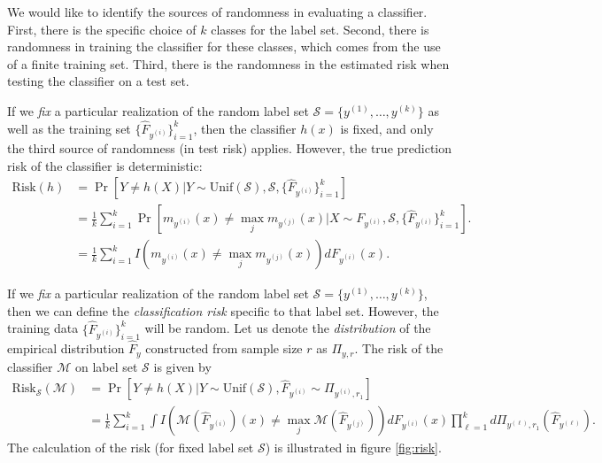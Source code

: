 We would like to identify the sources of randomness in evaluating a
classifier.  First, there is the specific choice of $k$ classes for
the label set.   Second, there is randomness in training the classifier
for these classes, which comes from the use of a finite training
set. Third, there is the randomness in the estimated risk when
testing the classifier on a test set.

If we \emph{fix} a particular realization of the random label set
$\mathcal{S} = \{y^{(1)}, \hdots, y^{(k)}\}$ as well as the training
set $\{\hat{F}_{y^{(i)}}\}_{i=1}^k$, then the classifier $h(x)$ is
fixed, and only the third source of randomness (in test risk) applies.
However, the true prediction risk of the classifier is deterministic:
\begin{align*}
\text{Risk}(h) &= \Pr[Y \neq h(X)|Y \sim \text{Unif}(\mathcal{S}),
  \mathcal{S}, \{\hat{F}_{y^{(i)}}\}_{i=1}^k] 
\\&= \frac{1}{k}
\sum_{i=1}^k \Pr[m_{y^{(i)}}(x) \neq \max_j m_{y^{(j)}}(x)|X \sim
  F_{y^{(i)}}, \mathcal{S}, \{\hat{F}_{y^{(i)}}\}_{i=1}^k].  
\\&= \frac{1}{k}
\sum_{i=1}^k I(m_{y^{(i)}}(x) \neq \max_j m_{y^{(j)}}(x)) dF_{y^{(i)}}(x).
\end{align*}


If we \emph{fix} a particular realization of the random label set
$\mathcal{S} = \{y^{(1)}, \hdots, y^{(k)}\}$, then we can define the
\emph{classification risk} specific to that label set.  However, the
training data $\{\hat{F}_{y^{(i)}}\}_{i=1}^k$ will be random.  Let us
denote the \emph{distribution} of the empirical distribution
$\hat{F}_y$ constructed from sample size $r$ as $\Pi_{y, r}$.  The
risk of the classifier $\mathcal{M}$ on label set $\mathcal{S}$ is
given by
\begin{align*}
\text{Risk}_{\mathcal{S}}(\mathcal{M}) &= \Pr[Y \neq h(X)|Y \sim
  \text{Unif}(\mathcal{S}), \hat{F}_{y^{(i)}} \sim \Pi_{y^{(i)}, r_1}] \\&= \frac{1}{k} \sum_{i=1}^k \int
I(\mathcal{M}(\hat{F}_{y^{(i)}})(x) \neq \max_j
\mathcal{M}(\hat{F}_{y^{(j)}})) dF_{y^{(i)}}(x) \prod_{\ell=1}^k
d\Pi_{y^{(\ell)}, r_1}(\hat{F}_{y^{(\ell)}}).
\end{align*}
The calculation of the risk (for fixed label set $\mathcal{S}$) is
illustrated in figure \ref{fig:risk}.

